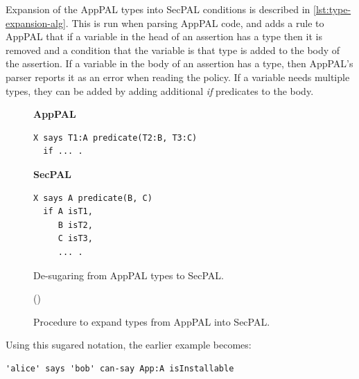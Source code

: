 \documentclass[thesis.tex]{subfiles}
\begin{document}
Expansion of the AppPAL types into SecPAL conditions is described in
\autoref{lst:type-expansion-alg}.  This is run when parsing AppPAL code,
and adds a rule to AppPAL that if a variable in the head of an
assertion has a type then it is removed and a condition that the
variable is that type is added to the body of the assertion.  If a
variable in the body of an assertion has a type, then AppPAL's parser
reports it as an error when reading the policy.  If a variable needs
multiple types, they can be added by adding additional \emph{if}
predicates to the body.

\begin{figure}\centering\noindent\sffamily\footnotesize
\begin{minipage}[t]{0.50\textwidth}
  \noindent
  \textbf{AppPAL}
  \begin{lstlisting}
X says T1:A predicate(T2:B, T3:C) 
  if ... .
\end{lstlisting}
\end{minipage}
\hfill
\begin{minipage}[t]{0.40\textwidth}
  \noindent
  \textbf{SecPAL}
\begin{lstlisting}
X says A predicate(B, C) 
  if A isT1, 
     B isT2, 
     C isT3, 
     ... .
\end{lstlisting}
\end{minipage}
  \caption{De-sugaring from AppPAL types to SecPAL.}
  \label{lst:type-expansion}
\end{figure}

\begin{figure}\footnotesize\sffamily\centering
{}
\begin{algorithm}[H]
  \Fn(){}{
    \;
  }
\end{algorithm}
  \caption{Procedure to expand types from AppPAL into SecPAL.}
  \label{lst:type-expansion-alg}
\end{figure}

Using this sugared notation, the earlier example becomes:
\begin{lstlisting}
'alice' says 'bob' can-say App:A isInstallable
\end{lstlisting}
\end{document}
